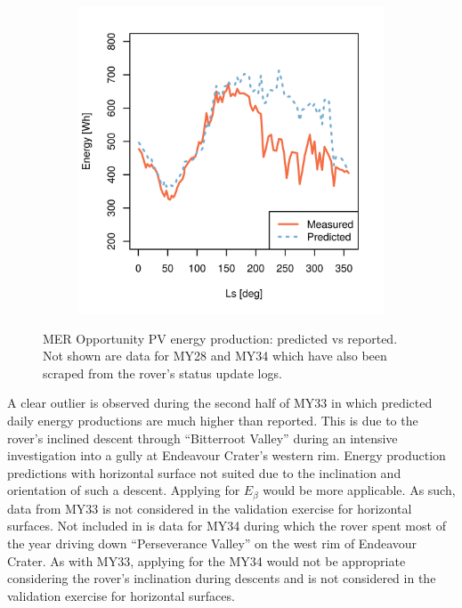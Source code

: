 \begin{figure}[h]
\begin{subfigure}[t]{\subfigureWidth}
  		\label{fig:plot:sub:mer-energy-production-predicted-vs-reported-my32}
  	\end{subfigure}\hfill
	   \begin{subfigure}[t]{\subfigureWidth}
      \centering
  		\includegraphics[height=\graphicsHeight]{sections/mars-solar-energy/photovoltaic-energy/plots/predicted-vs-measured-energy-my33.png}
  		\label{fig:plot:sub:mer-energy-production-predicted-vs-reported-my33}
	   \end{subfigure}\hfill
    \caption[MER Opportunity PV energy production: predicted vs reported]
            {MER Opportunity PV energy production: predicted vs reported. Not shown are data for MY28 and MY34 which have also been scraped from the rover's status update logs.}
	\label{fig:plot:mer-energy-production-predicted-vs-reported}
\vspace{-2ex}
\end{figure}

A clear outlier is observed during the second half of MY33 in which predicted daily energy productions are much higher than reported. This is due to the rover's inclined descent through ``Bitterroot Valley'' during an intensive investigation into a gully at Endeavour Crater's western rim. Energy production predictions with horizontal surface  not suited due to the inclination and orientation of such a descent. Applying  for $E_{\beta}$ would be more applicable. As such, data from MY33 is not considered in the validation exercise for horizontal surfaces. Not included in  is data for MY34 during which the rover spent most of the year driving down ``Perseverance Valley'' on the west rim of Endeavour Crater. As with MY33, applying  for the MY34 would not be appropriate considering the rover's inclination during descents and is not considered in the validation exercise for horizontal surfaces.


